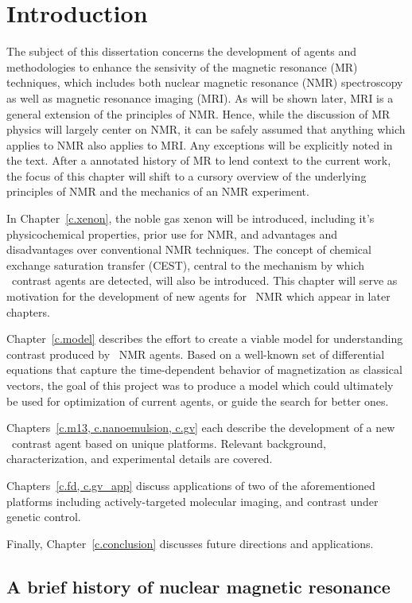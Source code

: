 \chapter{Introduction} \label{c.intro}
The subject of this dissertation concerns the development of agents and methodologies to enhance the sensivity of the magnetic resonance (MR) techniques, which includes both nuclear magnetic resonance (NMR) spectroscopy as well as magnetic resonance imaging (MRI). As will be shown later, MRI is a general extension of the principles of NMR. Hence, while the discussion of MR physics will largely center on NMR, it can be safely assumed that anything which applies to NMR also applies to MRI. Any exceptions will be explicitly noted in the text. After a annotated history of MR to lend context to the current work, the focus of this chapter will shift to a cursory overview of the underlying principles of NMR and the mechanics of an NMR experiment. 

In Chapter~\ref{c.xenon}, the noble gas xenon will be introduced, including it's physicochemical properties, prior use for NMR, and advantages and disadvantages over conventional NMR techniques. The concept of chemical exchange saturation transfer (CEST), central to the mechanism by which \xe\ contrast agents are detected, will also be introduced. This chapter will serve as motivation for the development of new agents for \xe\ NMR which appear in later chapters.

Chapter~\ref{c.model} describes the effort to create a viable model for understanding contrast produced by \xe\ NMR agents. Based on a well-known set of differential equations that capture the time-dependent behavior of magnetization as classical vectors, the goal of this project was to produce a model which could ultimately be used for optimization of current agents, or guide the search for better ones.

Chapters~\ref{c.m13, c.nanoemulsion, c.gv} each describe the development of a new \xe\ contrast agent based on unique platforms. Relevant background, characterization, and experimental details are covered.

Chapters~\ref{c.fd, c.gv_app} discuss applications of two of the aforementioned platforms including actively-targeted molecular imaging, and contrast under genetic control.

Finally, Chapter~\ref{c.conclusion} discusses future directions and applications.

\section{A brief history of nuclear magnetic resonance}

